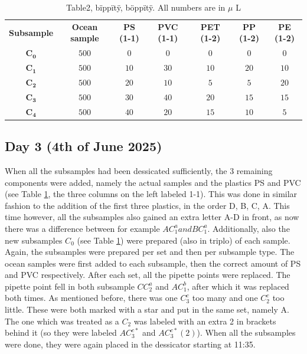 \documentclass[twocolumn,a4paper,aps,amsmath,amssymb,floatfix,superscriptaddress]{revtex4-2}
\begin{document}
	\begin{table}
		\centering
		\begin{threeparttable}
			\caption[table]{Table2, bïppïtÿ, böppïtÿ. All numbers are in $\mu$ L}
			\label{tab:Subsample_make-up}
			\begin{tabular}{c||c|c|c|c|c|c}
				\textbf{Subsample} & \textbf{Ocean sample } & \textbf{PS (1-1)} & \textbf{PVC (1-1)} & \textbf{PET (1-2)} & \textbf{PP (1-2)} & \textbf{PE (1-2)} \\
				\hhline{=======}
				 $\mathbf{C_0}$ & $500$ & $0$ & $0$ & $0$& $0$ & $0$ \\
				\hline
				  $\mathbf{C_1}$ & $500$ & $10$ & $30$ & $10$ & $20$ & $10$ \\
				\hline
				 $\mathbf{C_2}$ & $500$ & $20$ & $10$ & $5$ & $5$ & $20$ \\
				\hline
				 $\mathbf{C_3}$ & $500$ & $30$ & $40$ & $20$ & $15$ & $15$ \\
				\hline
				 $\mathbf{C_4}$ & $500$ & $40$ & $20$ & $15$ & $10$ & $5$ \\			
			\end{tabular}
		\end{threeparttable}
	\end{table}
	
	\subsection{Day 3 (4th of June 2025)}
	When all the subsamples had been dessicated sufficiently, the 3 remaining components were added, namely the actual samples and the plastics PS and PVC (see Table \ref{tab:Subsample_make-up}, the three columns on the left labeled 1-1). This was done in similar fashion to the addition of the first three plastics, in the order D, B, C, A. This time however, all the subsamples also gained an extra letter A-D in front, as now there was a difference between for example $AC_1^a and BC_1^a$. Additionally, also the new subsamples $C_0$ (see Table \ref{tab:Subsample_make-up}) were prepared (also in triplo) of each sample. Again, the subsamples were prepared per set and then per subsample type. The ocean samples were first added to each subsample, then the correct amount of PS and PVC respectively. 
	After each set, all the pipette points were replaced. The pipette point fell in both subsample $CC_2^a$ and $AC_1^b$, after which it was replaced both times. As mentioned before, there was one $C_3^c$ too many and one $C_2^c$ too little. These were both marked with a star and put in the same set, namely A. The one which was treated as a $C_2$ was labeled with an extra 2 in brackets behind it (so they were labeled $AC_3^{c*}$ and $AC_3^{c*} (2)$). When all the subsamples were done, they were again placed in the dessicator starting at 11:35.
	
\end{document}
